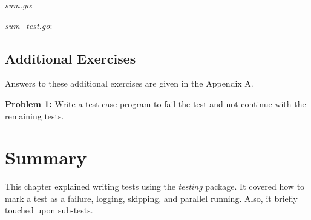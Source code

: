 \textit{sum.go}:



\textit{sum\_test.go}:



\subsection{Additional Exercises}

Answers to these additional exercises are given in the Appendix A.

\textbf{Problem 1:} Write a test case program to fail the test and not continue with the remaining tests.

\section*{Summary}

This chapter explained writing tests using the \textit{testing} package. It
covered how to mark a test as a failure, logging, skipping, and parallel
running. Also, it briefly touched upon sub-tests.
